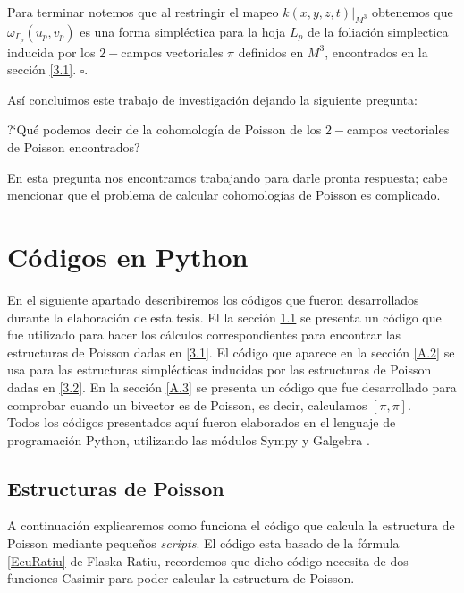 \documentclass[a4paper,10pt]{book}
\begin{document}
Para terminar notemos que al restringir el mapeo $k(x,y,z,t)|_{M^{3}}$ obtenemos que $\omega_{\Gamma_{p}}(u_{p},v_{p})$ es una forma simpl\'ectica para la hoja $L_{p}$ de la foliaci\'on simplectica inducida por los $2-$campos vectoriales $\pi$ definidos en $M^{3}$, encontrados en la secci\'on \ref{3.1}. \hfill $\square.$ 

\vspace{5mm}

As\'i concluimos este trabajo de investigaci\'on dejando la siguiente pregunta:
\begin{center}
?`Qu\'e podemos decir de la cohomolog\'ia de Poisson de los $2-$campos vectoriales de Poisson encontrados?
\end{center}
En esta pregunta nos encontramos trabajando para darle pronta respuesta; cabe mencionar que el problema de calcular cohomolog\'ias de Poisson es complicado.  
 
\appendix

\chapter{C\'odigos en Python}\label{A1}

En el siguiente apartado describiremos los c\'odigos que fueron desarrollados durante la elaboraci\'on de esta tesis. El la secci\'on \ref{A.1} se presenta un c\'odigo que fue utilizado para hacer los c\'alculos correspondientes para encontrar las estructuras de Poisson dadas en \ref{3.1}. El c\'odigo que aparece en la secci\'on \ref{A.2} se usa para las estructuras simpl\'ecticas inducidas por las estructuras de Poisson dadas en \ref{3.2}. En la secci\'on \ref{A.3} se presenta un c\'odigo que fue desarrollado para comprobar cuando un bivector es de Poisson, es decir, calculamos $[\pi,\pi]$.\\ 

Todos los c\'odigos presentados  aqu\'i fueron elaborados en el lenguaje de programaci\'on Python, utilizando las m\'odulos Sympy \cite{sympy} y Galgebra \cite{galgebra}.  
       
\section{Estructuras de Poisson}\label{A.1}

A continuaci\'on explicaremos como funciona el c\'odigo que calcula la estructura de Poisson mediante peque\~{n}os {\it scripts}. El c\'odigo esta basado de la f\'ormula \ref{EcuRatiu} de Flaska-Ratiu, recordemos que dicho c\'odigo necesita de dos funciones Casimir para poder calcular la estructura de Poisson.
\end{document}
